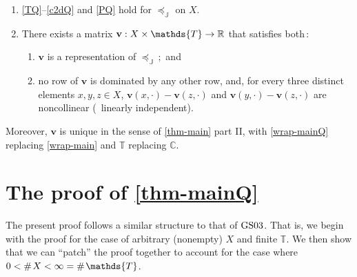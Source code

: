 \documentclass[12pt,a4paper,twoside]{article}
\newcommand{\gsii}{$\textup{GS03}$}
\newcommand{\preceqb}{\mathbin{\preceq}}
\newcommand{\countof}{\mathbin{\#}\hskip1pt}
\newcommand{\ext}{\mathrel{\mc R}}
\newcommand{\sext}{\mathrel{\mc P}}
\newcommand{\next}{\mathrel{\mc I}}
\newcommand{\sextb}{\mathbin{\mc P}}
\newcommand{\mbbc}{{\mathds C}}
\newcommand{\mbbt}{{\mathds {T}}}
\newcommand{\mbbj}{\mathds J}
\newcommand{\xy}{{(x, y)}}
\begin{document}
\begin{appendices}
\begin{theorem}
\begin{enumerate}[label=\textup{(\ref{thm-mainQ}.\roman*)}]

\item\label{ax-mainQ}

 \ref{TQ}--\ref{c2dQ} and
 \ref{PQ} hold for   $\preceqb _ { \mbbj }$ on $X$.
 
    
\item\label{wrap-mainQ} There exists a matrix
  $\mathbf{v} : X \times \mbbt \rightarrow \R$ that satisfies both$\,:$
  \begin{enumerate}[label=\textup{(\ref{thm-mainQ}.\alph*)}]
  \item\label{rep-mainQ}
  $\mathbf{v}$ is a representation of $\preceq _ { \mbbj }\,;$ and

\item\label{rows-mainQ} no row of
  $\mathbf{v}$ is dominated by any other row, and, for every three distinct elements
  $x,y, z \in X$, $\mathbf{v}(x,\cdot)-\mathbf{v}(z,\cdot)
 $ and $\mathbf{v}(y,\cdot)-\mathbf{v}(z,\cdot)$ are noncollinear (\ie\ linearly independent).
\end{enumerate}
\end{enumerate}
Moreover, $\mathbf{v}$ is unique in the sense of \cref{thm-main} part II, with
\ref{wrap-mainQ} replacing \ref{wrap-main} and $\mbbt$ replacing $\mbbc$.
\end{theorem}


\section{The proof of \cref{thm-mainQ}}\label{sec-proof-mainQ} The present
proof follows a similar structure to that of \gsii. That is, we begin with the
proof for the case of arbitrary (nonempty) $X$ and finite $\mbbt$. We then
show that we can ``patch'' the proof together to account for the case where $0
<  \countof X < \infty = \countof \mbbt$.




\end{appendices}
\end{document}
